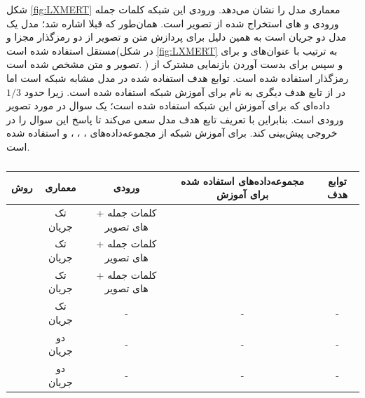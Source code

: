	شکل 
	\ref{fig:LXMERT}
	معماری مدل
	را نشان می‌دهد. ورودی این شبکه کلمات جمله ورودی و 
	های استخراج شده از تصویر است. همان‌طور که قبلا اشاره شد؛ مدل
	یک مدل دو جریان است به همین دلیل برای پردازش متن و تصویر از دو رمزگذار مجزا و مستقل استفاده شده است(در شکل 
	\ref{fig:LXMERT}
	به ترتیب با عنوان‌های  
	و 
	برای تصویر و متن مشخص شده است.
	) و سپس برای بدست آوردن بازنمایی مشترک از رمزگذار
	استفاده شده است. توابع هدف استفاده شده در مدل
	مشابه شبکه 
	است اما در 
	از تابع هدف دیگری به نام 
	برای آموزش شبکه استفاده شده است. زیرا حدود $1/3$ داده‌ای که برای آموزش این شبکه استفاده شده است؛ یک سوال در مورد تصویر ورودی است. بنابراین با تعریف تابع هدف 
	مدل سعی ‌می‌کند تا پاسخ این سوال را در خروجی پیش‌بینی کند. برای آموزش شبکه
	از مجموعه‌داده‌های 
	،
	،
	،
	و
	استفاده شده است.
	\begin{table}
		\caption{}
		\label{tabel:7}
		\centering
		\setlength\extrarowheight{2pt}
		\begin{tabularx}{\textwidth}{|C|C|C|C|C|}
			\hline
			\textbf{روش} & \textbf{معماری} &  \textbf{ورودی} & \textbf{مجموعه‌داده‌های استفاده شده برای آموزش} & \textbf{توابع هدف}\\
			\hline \hline
			
			\textbf{\cite{su2019vl}}& تک جریان & کلمات جمله + های تصویر &&
			\\
			\hline
			\textbf{\cite{chen2020uniter}}& تک جریان & کلمات جمله + های تصویر &  & \\
			\hline
			\textbf{\cite{li2020oscar}}& تک جریان & کلمات جمله + های تصویر  &  & \\
			\hline
			\textbf{\cite{zhou2020unified}}& تک جریان & - & - & -\\
			\hline \hline
			\textbf{\cite{lu2019vilbert}}& دو جریان & - & - & -\\
			\hline
			\textbf{\cite{tan2019lxmert}}& دو جریان & - & - & -\\
			\hline		
		\end{tabularx}
	\end{table}


